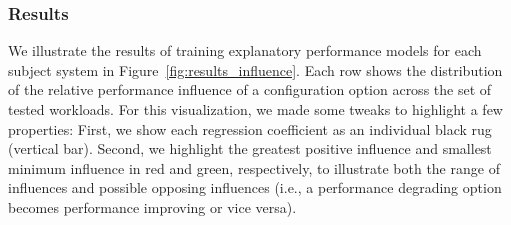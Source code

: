 {\subsubsection{Results}\label{sec:results2}
We illustrate the results of training explanatory performance models for each subject system in Figure~\ref{fig:results_influence}. Each row shows the distribution of the relative performance influence of a configuration option across the set of tested workloads. For this visualization, we made some tweaks to highlight a few properties: First, we show each regression coefficient as an individual black rug (vertical bar). Second, we highlight the greatest positive influence and smallest minimum influence in red and green, respectively, to illustrate both the range of influences and possible opposing influences (i.e., a performance degrading option becomes performance improving or vice versa). 
\begin{figure}
	\centering

\end{figure}}
